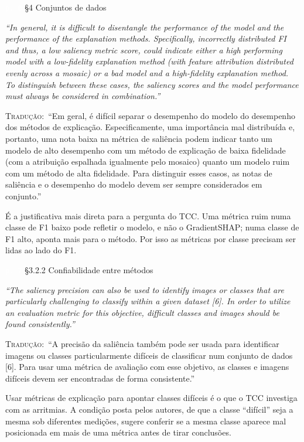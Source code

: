 \documentclass[11pt,a4paper]{article}
\newcommand{\pagechip}[1]{{\setlength{\fboxsep}{1.5pt}\colorbox{cAcc}{\textcolor{white}{\scriptsize\texttt{#1}}}}}
\newenvironment{origquote}{\par\itshape\small}{\par}
\newenvironment{tradquote}{\par\small\textsc{Tradução:}\ }{\par}
\newcommand{\explab}[1]{\par\smallskip{\small\color{cAcc}\textbf{\MakeUppercase{#1}}}\par}
\begin{document}
\begin{citacard}{\pagechip{p. 8} §4 Conjuntos de dados}
\begin{origquote}“In general, it is difficult to disentangle the performance of the model and the performance of the explanation methods. Specifically, incorrectly distributed FI and thus, a low saliency metric score, could indicate either a high performing model with a low-fidelity explanation method (with feature attribution distributed evenly across a mosaic) or a bad model and a high-fidelity explanation method. To distinguish between these cases, the saliency scores and the model performance must always be considered in combination.”\end{origquote}
\begin{tradquote}“Em geral, é difícil separar o desempenho do modelo do desempenho dos métodos de explicação. Especificamente, uma importância mal distribuída e, portanto, uma nota baixa na métrica de saliência podem indicar tanto um modelo de alto desempenho com um método de explicação de baixa fidelidade (com a atribuição espalhada igualmente pelo mosaico) quanto um modelo ruim com um método de alta fidelidade. Para distinguir esses casos, as notas de saliência e o desempenho do modelo devem ser sempre considerados em conjunto.”\end{tradquote}
\explab{Explicação}
É a justificativa mais direta para a pergunta do TCC. Uma métrica ruim numa classe de F1 baixo pode refletir o modelo, e não o GradientSHAP; numa classe de F1 alto, aponta mais para o método. Por isso as métricas por classe precisam ser lidas ao lado do F1.
\end{citacard}

\begin{citacard}{\pagechip{p. 7} §3.2.2 Confiabilidade entre métodos}
\begin{origquote}“The saliency precision can also be used to identify images or classes that are particularly challenging to classify within a given dataset [6]. In order to utilize an evaluation metric for this objective, difficult classes and images should be found consistently.”\end{origquote}
\begin{tradquote}“A precisão da saliência também pode ser usada para identificar imagens ou classes particularmente difíceis de classificar num conjunto de dados [6]. Para usar uma métrica de avaliação com esse objetivo, as classes e imagens difíceis devem ser encontradas de forma consistente.”\end{tradquote}
\explab{Explicação}
Usar métricas de explicação para apontar classes difíceis é o que o TCC investiga com as arritmias. A condição posta pelos autores, de que a classe “difícil” seja a mesma sob diferentes medições, sugere conferir se a mesma classe aparece mal posicionada em mais de uma métrica antes de tirar conclusões.
\end{citacard}
\end{document}
